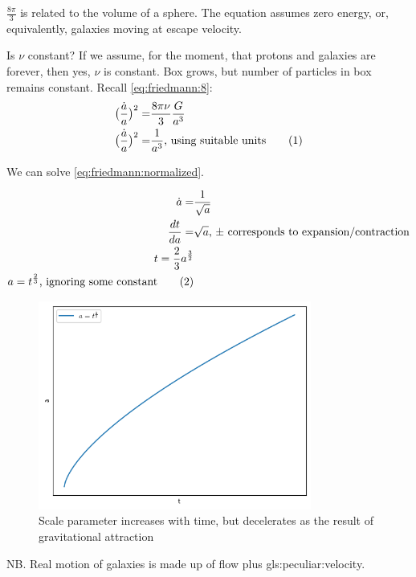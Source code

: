 \documentclass[]{article}
\newcommand\numberthis{\addtocounter{equation}{1}\tag{\theequation}}
\begin{document}
$\frac{8 \pi}{3}$ is related to the volume of a sphere. The equation assumes zero energy, or, equivalently, galaxies moving at escape velocity.

Is $\nu$ constant? If we assume, for the moment, that protons and galaxies are forever, then yes, $\nu$ is constant. Box grows, but number of particles in box remains constant. Recall \eqref{eq:friedmann:8}:
\begin{align*}
	\big(\frac{\dot{a}}{a}\big)^2 =& \frac{8 \pi \nu}{3}\frac{G}{a^3} \\
	\big(\frac{\dot{a}}{a}\big)^2 =& \frac{1}{a^3} \text{, using suitable units} \numberthis \label{eq:friedmann:normalized}
\end{align*}

We can solve \eqref{eq:friedmann:normalized}.

\begin{align*}
	\dot{a} =& \frac{1}{\sqrt{a}}\\
	\frac{dt}{da} =& \sqrt{a} \text{, $\pm$ corresponds to expansion/contraction} \\
	t = \frac{2}{3}a^{\frac{3}{2}}\\
	a = t^\frac{2}{3} \text{, ignoring some constant} \numberthis \label{eq:2:3}
\end{align*}

\begin{figure}
	\caption[Decelerating growth of scale parameter]{Scale parameter increases with time, but decelerates as the result of gravitational attraction}
	\includegraphics[width=0.8\textwidth]{cosmo-2-a-t}
\end{figure}


	
NB. Real motion of galaxies is made up of flow plus \gls{gls:peculiar:velocity}.
\end{document}
